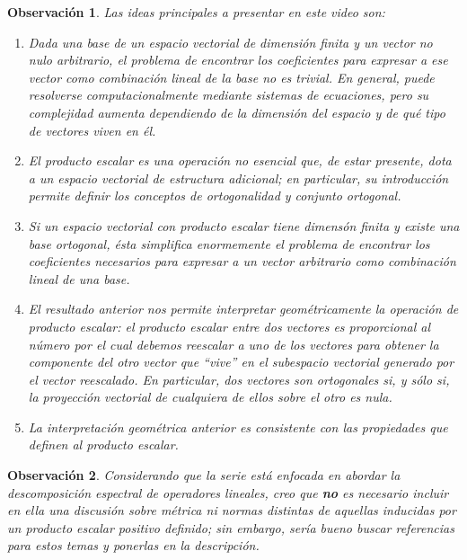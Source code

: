 \documentclass[12pt,dvipsnames]{article}
\newtheorem{obs}{Observación}[section]
\numberwithin{equation}{section}
\begin{document}
\begin{obs}
Las ideas principales a presentar en este video son:
\begin{enumerate}[label=(\roman*)]
    \item Dada una base de un espacio vectorial de dimensión finita y un vector no nulo arbitrario, el problema de encontrar los coeficientes para expresar a ese vector como combinación lineal de la base no es trivial. En general, puede resolverse computacionalmente mediante sistemas de ecuaciones, pero su complejidad aumenta dependiendo de la dimensión del espacio y de qué tipo de vectores viven en él.
    
    \item El producto escalar es una operación no esencial que, de estar presente, dota a un espacio vectorial de estructura adicional; en particular, su introducción permite definir los conceptos de ortogonalidad y conjunto ortogonal.
    
    \item Si un espacio vectorial con producto escalar tiene dimensón finita y existe una base ortogonal, ésta simplifica enormemente el problema de encontrar los coeficientes necesarios para expresar a un vector arbitrario como combinación lineal de una base.

    \item El resultado anterior nos permite interpretar geométricamente la operación de producto escalar: el producto escalar entre dos vectores es proporcional al número por el cual debemos reescalar a uno de los vectores para obtener la componente del otro vector que ``vive'' en el subespacio vectorial generado por el vector reescalado. En particular, dos vectores son ortogonales si, y sólo si, la proyección vectorial de cualquiera de ellos sobre el otro es nula.
    
    \item La interpretación geométrica anterior es consistente con las propiedades que definen al producto escalar.
\end{enumerate}
\end{obs}

\begin{obs}
Considerando que la serie está enfocada en abordar la descomposición espectral de operadores lineales, creo que \textbf{no} es necesario incluir en ella una discusión sobre métrica ni normas distintas de aquellas inducidas por un producto escalar positivo definido; sin embargo, sería bueno buscar referencias para estos temas y ponerlas en la descripción.
\end{obs}
\end{document}
